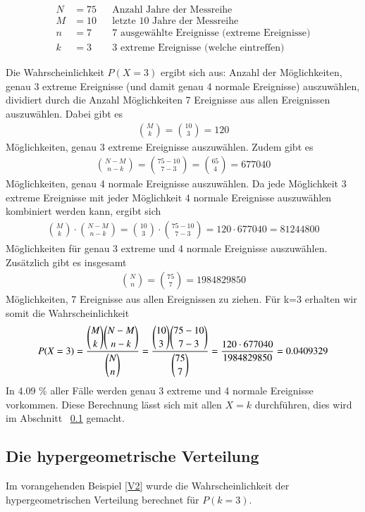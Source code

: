 \begin{refsection}
\begin{align*}
N&=75&&\text{Anzahl Jahre der Messreihe}\\
M&=10&&\text{letzte 10 Jahre der Messreihe}\\
n&=7&&\text{7 ausgewählte Ereignisse (extreme Ereignisse)}\\
k&=3&&\text{3 extreme Ereignisse (welche eintreffen)}
\end{align*}

Die Wahrscheinlichkeit $P(X=3)$ ergibt sich aus:
Anzahl der Möglichkeiten, genau 3 extreme Ereignisse (und damit genau 4 normale Ereignisse) auszuwählen, dividiert durch die Anzahl Möglichkeiten 7 Ereignisse aus allen Ereignissen auszuwählen. Dabei gibt es
\begin{align*}
\binom{M}{k} = \binom{10}{3} = 120
\end{align*}
%
Möglichkeiten, genau 3 extreme Ereignisse auszuwählen.
Zudem gibt es 
\begin{align*}
\binom{N-M}{n-k} = \binom{75-10}{7-3} = \binom{65}{4} = 677040
\end{align*}
%
Möglichkeiten, genau 4 normale Ereignisse auszuwählen.
Da jede Möglichkeit 3 extreme Ereignisse mit jeder Möglichkeit 4 normale Ereignisse auszuwählen kombiniert werden kann, ergibt sich
\begin{align*}
\binom{M}{k} \cdot \binom{N-M}{n-k} = \binom{10}{3} \cdot \binom{75-10}{7-3} = 120 
\cdot 677040 = 81244800
\end{align*}
%
Möglichkeiten für genau 3 extreme und 4 normale Ereignisse auszuwählen.
Zusätzlich gibt es insgesamt
\begin{align*}
\binom{N}{n} = \binom{75}{7} = 1984829850
\end{align*}
%
Möglichkeiten, 7 Ereignisse aus allen Ereignissen zu ziehen.
Für k=3 erhalten wir somit die Wahrscheinlichkeit
\begin{equation}
P(X = 3) = \frac{\displaystyle \binom{M}{k} \binom{N-M}{n-k}}{\displaystyle \binom{N}{n} }  \\
= \frac{\displaystyle \binom{10}{3} \binom{75-10}{7-3}}{\displaystyle \binom{75}{7} } \\
= \frac{ 120 \cdot 677040}{ 1984829850 } = 0.0409329 
\label {V2}
\end{equation}
%
In 4.09 \% aller Fälle werden genau 3 extreme und 4 normale Ereignisse vorkommen. Diese Berechnung lässt sich mit allen $X=k$ durchführen, dies wird im Abschnitt ~\ref{Dichtehyper} gemacht.


\subsection{Die hypergeometrische Verteilung} \label{Dichtehyper}
Im vorangehenden Beispiel \eqref{V2} wurde die Wahrscheinlichkeit der hypergeometrischen Verteilung berechnet für $P(k = 3)$. 


\end{refsection}
